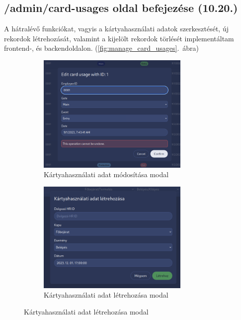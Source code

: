 \documentclass[a4paper]{article}
\begin{document}
\subsection{/admin/card-usages oldal befejezése (10.20.)}

A hátralévő funkciókat, vagyis a kártyahasználati adatok
szerkesztését, új rekordok létrehozását, valamint a kijelölt rekordok
törlését implementáltam frontend-, és backendoldalon. (\ref{fig:manage_card_usages}.~ábra)

\begin{figure}[ht]
    \centering
    \begin{subfigure}[b]{0.8\textwidth}
        \centering
        \includegraphics[width=0.8\textwidth]{images/card_usage_modify.png}
        \caption{Kártyahasználati adat módosítása modal}
        \label{fig:card_usage_modify}
    \end{subfigure}

    \vspace{1em} %

    \begin{subfigure}[b]{0.8\textwidth}
        \centering
        \includegraphics[width=0.8\textwidth]{images/create_card_usage.png}
        \caption{Kártyahasználati adat létrehozása modal}
        \label{fig:card_usage_create}
    \end{subfigure}


\end{figure}
\end{document}
